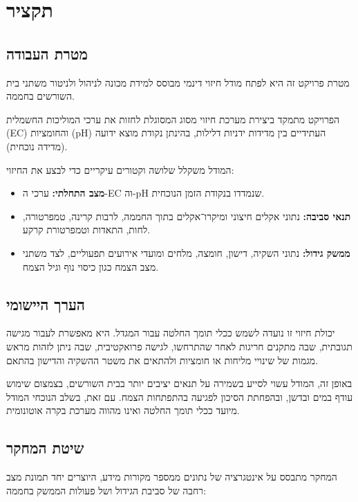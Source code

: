 \section{תקציר}

\subsection{מטרת העבודה}
מטרת פרויקט זה היא לפתח מודל חיזוי דינמי מבוסס למידת מכונה  לניהול ולניטור משתני בית השורשים בחממה.

הפרויקט מתמקד ביצירת מערכת חיזוי מסוג \SoftSensor{} המסוגלת לחזות את ערכי המוליכות החשמלית (EC) והחומציות (pH) העתידיים בין מדידות ידניות דלילות, בהינתן נקודת מוצא ידועה (מדידה נוכחית).

המודל משקלל שלושה וקטורים עיקריים כדי לבצע את החיזוי:

\begin{itemize}
    \item \textbf{מצב התחלתי:} ערכי ה-EC וה-pH שנמדדו בנקודת הזמן הנוכחית.
    \item \textbf{תנאי סביבה:} נתוני אקלים חיצוני ומיקרו־אקלים בתוך החממה, לרבות קרינה, טמפרטורה, לחות, התאדות וטמפרטורת קרקע.
    \item \textbf{ממשק גידול:} נתוני השקיה, דישון, חומצה, מלחים ומועדי אירועים תפעוליים, לצד משתני מצב הצמח כגון כיסוי נוף וגיל הצמח.
\end{itemize}

\subsection{הערך היישומי}
יכולת חיזוי זו נועדה לשמש ככלי תומך החלטה עבור המגדל. היא מאפשרת לעבור מגישה תגובתית, שבה מתקנים חריגות לאחר שהתרחשו, לגישה פרואקטיבית, שבה ניתן לזהות מראש מגמות של שינויי מליחות או חומציות ולהתאים את משטר ההשקיה והדישון בהתאם.

באופן זה, המודל עשוי לסייע בשמירה על תנאים יציבים יותר בבית השורשים, בצמצום שימוש עודף במים ובדשן, ובהפחתת הסיכון לפגיעה בהתפתחות הצמח. עם זאת, בשלב הנוכחי המודל מיועד ככלי תומך החלטה ואינו מהווה מערכת בקרה אוטונומית.

\subsection{שיטת המחקר}
המחקר מתבסס על אינטגרציה של נתונים ממספר מקורות מידע, היוצרים יחד תמונת מצב רחבה של סביבת הגידול ושל פעולות הממשק בחממה:

